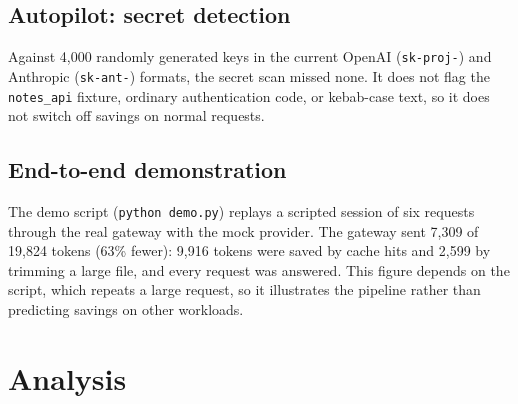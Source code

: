 \documentclass[12pt, a4paper, oneside]{report}
\newcommand{\code}[1]{\texttt{#1}}
\begin{document}
\subsection{Autopilot: secret detection}

Against 4,000 randomly generated keys in the current OpenAI (\code{sk-proj-}) and
Anthropic (\code{sk-ant-}) formats, the secret scan missed none. It does not flag
the \code{notes\_api} fixture, ordinary authentication code, or kebab-case text,
so it does not switch off savings on normal requests.

\subsection{End-to-end demonstration}

The demo script (\code{python demo.py}) replays a scripted session of six requests
through the real gateway with the mock provider. The gateway sent 7,309 of 19,824
tokens (63\% fewer): 9,916 tokens were saved by cache hits and 2,599 by trimming a
large file, and every request was answered. This figure depends on the script,
which repeats a large request, so it illustrates the pipeline rather than
predicting savings on other workloads.

\section{Analysis}
\end{document}
